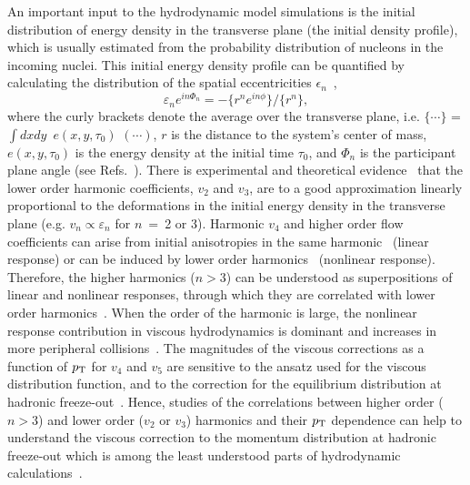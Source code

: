 An important input to the hydrodynamic model simulations is the initial distribution of energy density in the transverse plane (the initial density profile), which is usually estimated from the probability distribution of nucleons in the incoming nuclei.
This initial energy density profile can be quantified by calculating the distribution of the spatial eccentricities $\epsilon_n$~\cite{Alver:2010gr},
\begin{equation}
 \varepsilon_{n} e^{in\Phi_{n}} = -\{r^n e^{in\phi}\}/ \{r^n\},
  \label{eq:eccentricities}
\end{equation}
where the curly brackets denote the average over the transverse plane, i.e. $\{\cdots\}$ = $\int dxdy$\, $e(x,y,\tau_0)$ $(\cdots)$, $r$ is the distance to the system's center of mass, $e(x,y,\tau_0)$ is the energy density at the initial time $\tau_0$, and $\Phi_{n}$ is the participant plane angle (see Refs.~\cite{Teaney:2010vd,Niemi:2015qia}).
There is experimental and theoretical evidence~\cite{Alver:2010gr,Qiu:2011iv,ALICE:2011ab} that the lower order harmonic coefficients, $v_2$ and $v_3$, are to a good approximation linearly proportional to the deformations in the initial energy density in the transverse plane (e.g. $v_n \propto \varepsilon_n$ for $n~=~$2 or 3).
Harmonic $v_4$ and higher order flow coefficients can arise from initial anisotropies in the same harmonic~\cite{Alver:2010gr,Teaney:2010vd,Gubser:2010ui,Hatta:2014jva} (linear response) or can be induced by lower order harmonics~\cite{Bravina:2013xla,Bravina:2013ora} (nonlinear response).
Therefore, the higher harmonics ($n>3$) can be understood as superpositions of linear and nonlinear responses, through which they are correlated with lower order harmonics~\cite{Teaney:2012ke,Bravina:2013ora,Gubser:2010ui,Hatta:2014jva}. When the order of the harmonic is large, the nonlinear response contribution in viscous hydrodynamics is dominant and increases in more peripheral collisions~\cite{Teaney:2012ke,Bravina:2013ora}.
The magnitudes of the viscous corrections as a function of $p_{\rm T}$ for $v_4$ and $v_5$ are sensitive to the ansatz used for the viscous distribution function, and to the correction for the equilibrium distribution at hadronic freeze-out~\cite{Luzum:2010ad,Teaney:2012ke}.
Hence, studies of the correlations between higher order ($n>3$) and lower order ($v_2$ or $v_3$) harmonics and their $p_{\rm T}$ dependence can help to understand the viscous correction to the momentum distribution at hadronic freeze-out which is among the least understood parts of hydrodynamic calculations~\cite{Dusling:2009df,Teaney:2012ke,Molnar:2014fva,Niemi:2015qia}.

